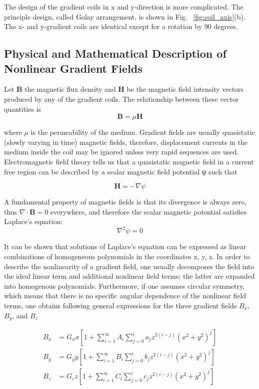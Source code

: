The design of the gradient coils in x and y-direction is more complicated. The principle design, called Golay arrangement, is shown in Fig. ~\ref{fig:coil_axis}(b). The x- and y-gradient coils are identical except for a rotation by 90 degrees. 

\subsection{Physical and Mathematical Description of Nonlinear Gradient Fields}

Let \textbf{B} the magnetic flux density and \textbf{H} be the magnetic field intensity vectors produced by any of the gradient coils. The relationship between these vector quantities is 
\begin{equation}
  \textbf{B} = \mu \textbf{H}
\end{equation}

where $\mu$ is the permeability of the medium. Gradient fields are usually quasistatic (slowly varying in time) magnetic fields, therefore, displacement currents in the medium inside the coil may be ignored unless very rapid sequences are used. Electromagnetic field theory tells us that a quasistatic magnetic field in a current free region can be described by a scalar magnetic field potential ψ such that 

\begin{equation}
  \textbf{H} = - \nabla \psi 
\end{equation}

A fundamental property of magnetic fields is that its divergence is always zero, thus $\nabla \cdot \mathbf{B} = 0$ everywhere, and therefore the scalar magnetic potential satisfies Laplace’s equation:
\begin{equation}
  \nabla^2 \psi = 0 
\end{equation}

It can be shown that solutions of Laplace’s equation can be expressed as linear combinations of 
homogeneous polynomials  in the coordinates x, y, z. In order to describe the nonlinearity of a 
gradient field, one usually decomposes the field into the ideal linear term and additional nonlinear 
field terms; the latter are expanded into homogenous polynomials. Furthermore, if one assumes circular 
symmetry, which means that there is no specific angular dependence of the nonlinear field terms, one 
obtains following general expressions for the three gradient fields $B_x$, $B_y$, and $B_z$

\begin{align}
  B_x &= G_x x \left[ 1 + \sum^{\infty}_{i=1}A_i\sum^{i}_{j=0}a_jz^{2(i-j)}(x^2 + y^2)^j \right] \nonumber \\
  B_y &= G_y y \left[ 1 + \sum^{\infty}_{i=1}B_i\sum^{i}_{j=0}b_jz^{2(i-j)}(x^2 + y^2)^j \right] \label{eqn:distortion1}\\
  B_z &= G_c z \left[ 1 + \sum^{\infty}_{i=1}C_i\sum^{i}_{j=0}c_jz^{2(i-j)}(x^2 + y^2)^j \right] \nonumber 
\end{align}


